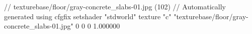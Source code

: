 // texturebase/floor/gray-concrete_slabs-01.jpg (102)
// Automatically generated using cfgfix
setshader "stdworld"
texture "c" "texturebase/floor/gray-concrete_slabs-01.jpg" 0 0 0 1.000000
